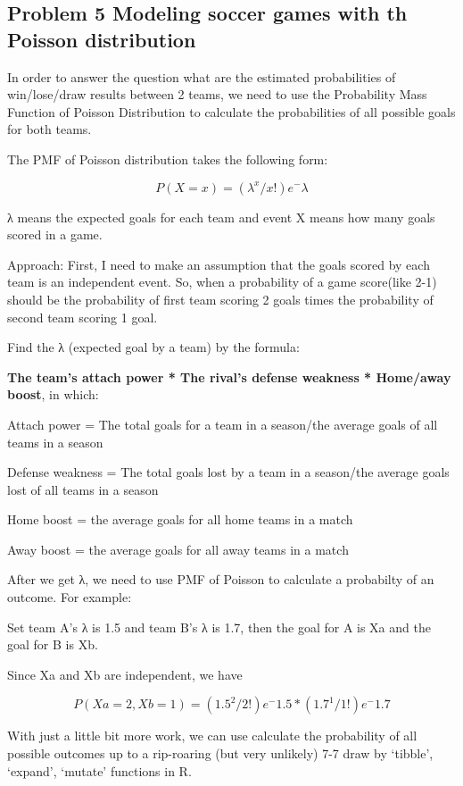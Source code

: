 \documentclass[
]{article}
\begin{document}
\hypertarget{problem-5-modeling-soccer-games-with-th-poisson-distribution}{%
\subsection{Problem 5 Modeling soccer games with th Poisson distribution}\label{problem-5-modeling-soccer-games-with-th-poisson-distribution}}

In order to answer the question what are the estimated probabilities of win/lose/draw results between 2 teams, we need to use the Probability Mass Function of Poisson Distribution to calculate the probabilities of all possible goals for both teams.

The PMF of Poisson distribution takes the following form:

\[
P(X=x)=(λ^x/x!)e^−λ
\]

λ means the expected goals for each team and event X means how many goals scored in a game.

Approach: First, I need to make an assumption that the goals scored by each team is an independent event. So, when a probability of a game score(like 2-1) should be the probability of first team scoring 2 goals times the probability of second team scoring 1 goal.

Find the λ (expected goal by a team) by the formula:

\textbf{The team's attach power * The rival's defense weakness * Home/away boost}, in which:

Attach power = The total goals for a team in a season/the average goals of all teams in a season

Defense weakness = The total goals lost by a team in a season/the average goals lost of all teams in a season

Home boost = the average goals for all home teams in a match

Away boost = the average goals for all away teams in a match

After we get λ, we need to use PMF of Poisson to calculate a probabilty of an outcome. For example:

Set team A's λ is 1.5 and team B's λ is 1.7, then the goal for A is Xa and the goal for B is Xb.

Since Xa and Xb are independent, we have

\[
P(Xa=2,Xb=1) = (1.5^2/2!)e^−1.5 * (1.7^1/1!)e^−1.7
\]

With just a little bit more work, we can use calculate the probability of all possible outcomes up to a rip-roaring (but very unlikely) 7-7 draw by `tibble', `expand', `mutate' functions in R.
\end{document}
